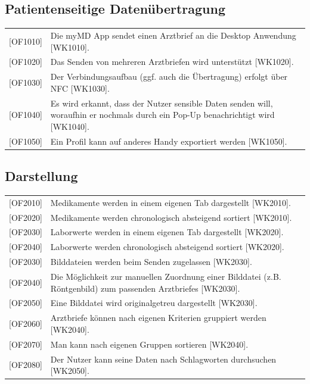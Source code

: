 \documentclass[a4paper]{scrreprt}
\begin{document}
\subsection{Patientenseitige Datenübertragung}
\begin{tabular}{lll}
[OF1010]&  \multicolumn{2}{p{12cm}}{Die myMD \gls{App} sendet einen Arztbrief an die \gls{Desktop Anwendung} [WK1010].}\\
{[OF1020]} &  \multicolumn{2}{p{12cm}}{Das Senden von mehreren Arztbriefen wird unterstützt [WK1020].}  \\
{[OF1030]} &  \multicolumn{2}{p{12cm}}{Der Verbindungsaufbau (ggf. auch die Übertragung) erfolgt über \gls{NFC} [WK1030].}  \\
{[OF1040]} &  \multicolumn{2}{p{12cm}}{Es wird erkannt, dass der Nutzer sensible Daten senden will, woraufhin er nochmals durch ein Pop-Up benachrichtigt wird [WK1040].}  \\
{[OF1050]} &  \multicolumn{2}{p{12cm}}{Ein Profil kann auf anderes Handy exportiert werden [WK1050].}  \\

\end{tabular}

\subsection{Darstellung}
\begin{tabular}{lll}
[OF2010]&  \multicolumn{2}{p{12cm}}{Medikamente werden in einem eigenen Tab dargestellt [WK2010].}\\
{[OF2020]}&  \multicolumn{2}{p{12cm}}{Medikamente werden chronologisch absteigend sortiert [WK2010].}\\
{[OF2030]}&  \multicolumn{2}{p{12cm}}{Laborwerte werden in einem eigenen Tab dargestellt [WK2020].}\\
{[OF2040]}&  \multicolumn{2}{p{12cm}}{Laborwerte werden chronologisch absteigend sortiert [WK2020].}\\
{[OF2030]} &  \multicolumn{2}{p{12cm}}{Bilddateien werden beim Senden zugelassen [WK2030].}  \\
{[OF2040]} &  \multicolumn{2}{p{12cm}}{Die Möglichkeit zur manuellen Zuordnung einer Bilddatei (z.B. Röntgenbild) zum passenden Arztbriefes [WK2030].}  \\
{[OF2050]} &  \multicolumn{2}{p{12cm}}{Eine Bilddatei wird originalgetreu dargestellt [WK2030].}  \\
{[OF2060]} &  \multicolumn{2}{p{12cm}}{Arztbriefe können nach eigenen Kriterien gruppiert werden [WK2040].}  \\
{[OF2070]} &  \multicolumn{2}{p{12cm}}{Man kann nach eigenen Gruppen sortieren [WK2040].}  \\
{[OF2080]} &  \multicolumn{2}{p{12cm}}{Der Nutzer kann seine Daten nach Schlagworten durchsuchen [WK2050].}  \\

\end{tabular}
\end{document}
